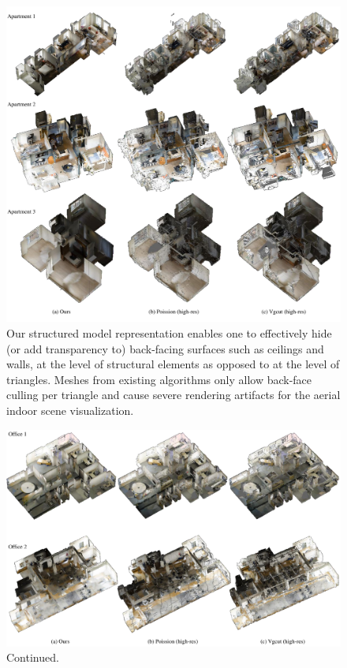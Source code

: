 \clearpage
\begin{figure}
 \begin{center}
    \includegraphics[width=\textwidth]{../figures/comp_meshes3.pdf}
 \end{center}
 \caption{Our structured model representation enables one to effectively
 hide (or add transparency to) back-facing surfaces such as ceilings and
 walls, at the level of structural elements as opposed to at the level of
 triangles. Meshes from existing algorithms only allow back-face culling per
 triangle and cause severe rendering artifacts for the aerial indoor
 scene visualization. }  \label{fig:comp_mesh0}
\end{figure}

\clearpage
\begin{figure}
 \begin{center}
    \includegraphics[width=\textwidth]{../figures/comp_meshes4.pdf}
 \end{center}
 \caption{Continued.}  \label{fig:comp_mesh1}
\end{figure}


